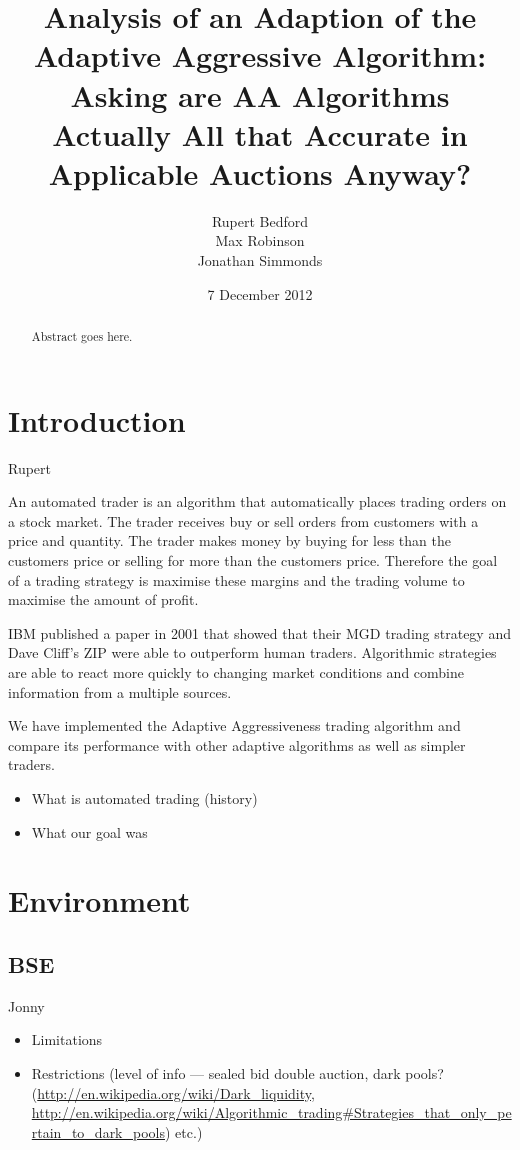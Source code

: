 \documentclass{acm_proc_article-sp}
\begin{document}
\title{Analysis of an Adaption of the Adaptive Aggressive Algorithm: Asking are AA Algorithms Actually All that Accurate in Applicable Auctions Anyway?}
\author{
  \alignauthor
    Rupert Bedford\\
  \alignauthor
    Max Robinson\\
  \alignauthor
    Jonathan Simmonds
}
\date{7 December 2012}

\maketitle
\begin{abstract}
Abstract goes here.
\end{abstract}

\pagebreak

\section{Introduction}
Rupert

An automated trader is an algorithm that automatically places trading orders on
a stock market.
The trader receives buy or sell orders from customers with a price and
quantity.
The trader makes money by buying for less than the customers price or selling
for more than the customers price.
Therefore the goal of a trading strategy is maximise these margins and the
trading volume to maximise the amount of profit.

IBM published a paper in 2001 that showed that their MGD trading strategy and
Dave Cliff's ZIP were able to outperform human traders.
Algorithmic strategies are able to react more quickly to changing market
conditions and combine information from a multiple sources.

We have implemented the Adaptive Aggressiveness trading algorithm and compare
its performance with other adaptive algorithms as well as simpler traders.

\begin{itemize}
	\item What is automated trading (history)
	\item What our goal was
\end{itemize}


\section{Environment}
\subsection{BSE}
Jonny
\begin{itemize} \itemsep0pt
	\item Limitations
	\item Restrictions (level of info --- sealed bid double auction, dark pools? (\url{http://en.wikipedia.org/wiki/Dark_liquidity}, \url{http://en.wikipedia.org/wiki/Algorithmic_trading#Strategies_that_only_pertain_to_dark_pools}) etc.)
\end{itemize}
\end{document}
